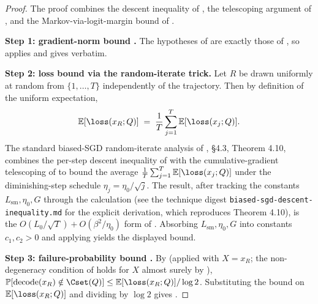 \begin{proof}
The proof combines the descent inequality of ,
the telescoping argument of , and the
Markov-via-logit-margin bound of .

\noindent\textbf{Step 1: gradient-norm bound .}
The hypotheses of  are exactly those of
, so 
applies and gives  verbatim.

\noindent\textbf{Step 2: loss bound  via the random-iterate trick.}
Let $R$ be drawn uniformly at random from $\{1, \dots, T\}$ independently
of the trajectory. Then by definition of the uniform expectation,
\begin{align}\label{eq:random_iterate_avg}
   \E[\loss(x_R; Q)]
   \;=\; \frac{1}{T} \sum_{j=1}^T \E[\loss(x_j; Q)].
\end{align}
The standard biased-SGD random-iterate analysis of
\cite{bottou2018optimization}, \S 4.3, Theorem 4.10, combines the
per-step descent inequality of  with the
cumulative-gradient telescoping of  to bound the
average $\frac{1}{T}\sum_{j=1}^T \E[\loss(x_j; Q)]$ under the
diminishing-step schedule $\eta_j = \eta_0 / \sqrt j$. The result, after
tracking the constants $L_{\mathrm{sm}}, \eta_0, G$ through the
calculation (see the technique digest
\texttt{biased-sgd-descent-inequality.md} for the explicit derivation,
which reproduces \cite{bottou2018optimization} Theorem 4.10), is the
$O(L_0 / \sqrt T) + O(\beta^2 / \eta_0)$ form of
. Absorbing $L_{\mathrm{sm}}, \eta_0, G$ into
constants $c_1, c_2 > 0$ and applying 
yields the displayed bound.

\noindent\textbf{Step 3: failure-probability bound .}
By  (applied with $X = x_R$; the
non-degeneracy condition  of
 holds for $X$ almost surely by
),
$\Pr[\dec(x_R) \notin \Cset(Q)] \le \E[\loss(x_R; Q)] / \log 2$.
Substituting the bound  on
$\E[\loss(x_R; Q)]$ and dividing by $\log 2$ gives
.
\end{proof}

